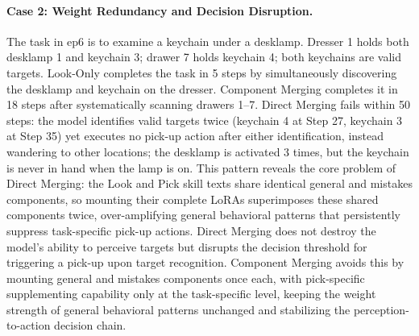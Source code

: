 \paragraph{Case 2: Weight Redundancy and Decision Disruption.}
The task in ep6 is to examine a keychain under a desklamp. Dresser 1 holds both desklamp 1 and keychain 3; drawer 7 holds keychain 4; both keychains are valid targets. Look-Only completes the task in 5 steps by simultaneously discovering the desklamp and keychain on the dresser. Component Merging completes it in 18 steps after systematically scanning drawers 1--7. Direct Merging fails within 50 steps: the model identifies valid targets twice (keychain 4 at Step 27, keychain 3 at Step 35) yet executes no pick-up action after either identification, instead wandering to other locations; the desklamp is activated 3 times, but the keychain is never in hand when the lamp is on. This pattern reveals the core problem of Direct Merging: the Look and Pick skill texts share identical general and mistakes components, so mounting their complete LoRAs superimposes these shared components twice, over-amplifying general behavioral patterns that persistently suppress task-specific pick-up actions. Direct Merging does not destroy the model's ability to perceive targets but disrupts the decision threshold for triggering a pick-up upon target recognition. Component Merging avoids this by mounting general and mistakes components once each, with pick-specific supplementing capability only at the task-specific level, keeping the weight strength of general behavioral patterns unchanged and stabilizing the perception-to-action decision chain.

